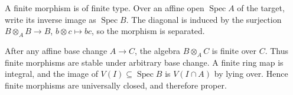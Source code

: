 A finite morphism is of finite type. Over an affine open $\operatorname{Spec}A$ of the target, write its inverse image as $\operatorname{Spec}B$. The diagonal is induced by the surjection $B\otimes_AB\to B$, $b\otimes c\mapsto bc$, so the morphism is separated.

After any affine base change $A\to C$, the algebra $B\otimes_AC$ is finite over $C$. Thus finite morphisms are stable under arbitrary base change. A finite ring map is integral, and the image of $V(I)\subseteq\operatorname{Spec}B$ is $V(I\cap A)$ by lying over. Hence finite morphisms are universally closed, and therefore proper.
